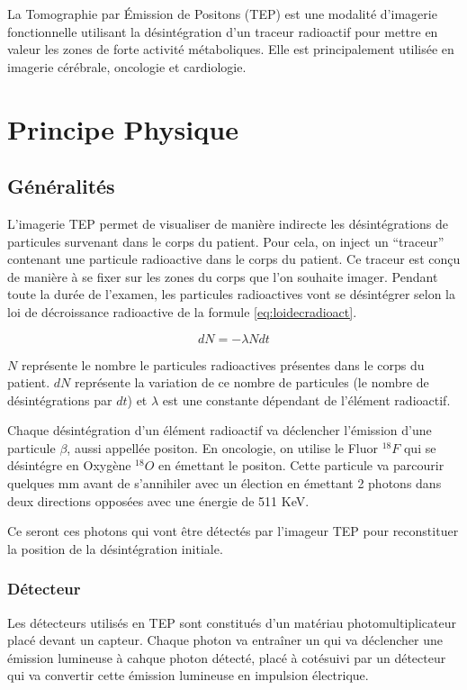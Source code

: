 \label{lab:chapPET}
La Tomographie par \'Emission de Positons (TEP) est une modalité d'imagerie fonctionnelle utilisant la désintégration d'un traceur radioactif pour mettre en valeur les zones de forte activité métaboliques. Elle est principalement utilisée en imagerie cérébrale, oncologie et cardiologie.

\chapter{Principe Physique}


	\section{Généralités}
L'imagerie TEP permet de visualiser de manière indirecte les désintégrations de particules survenant dans le corps du patient. Pour cela, on inject un ``traceur'' contenant une particule radioactive dans le corps du patient. Ce traceur est conçu de manière à se fixer sur les zones du corps que l'on souhaite imager. Pendant toute la durée de l'examen, les particules radioactives vont se désintégrer selon la loi de décroissance radioactive de la formule \ref{eq:loidecradioact}.

\begin{equation}
	dN = - \lambda N dt
	\label{eq:loidecradioact}
\end{equation}

$N$ représente le nombre le particules radioactives présentes dans le corps du patient. $dN$ représente la variation de ce nombre de particules (le nombre de désintégrations par $dt$) et $\lambda$ est une constante dépendant de l'élément radioactif.

Chaque désintégration d'un élément radioactif va déclencher l'émission d'une particule $\beta$, aussi appellée positon. En oncologie, on utilise le Fluor $^{18}F$ qui se désintégre en Oxygène $^{18}O$ en émettant le positon. Cette particule va parcourir quelques mm avant de s'annihiler avec un élection en émettant 2 photons dans deux directions opposées avec une énergie de 511 KeV.

Ce seront ces photons qui vont être détectés par l'imageur TEP pour reconstituer la position de la désintégration initiale. 
	\subsection{Détecteur}

Les détecteurs utilisés en TEP sont constitués d'un matériau photomultiplicateur placé devant un capteur. Chaque photon va entraîner un qui va déclencher une émission lumineuse à cahque photon détecté, placé à cotésuivi par un détecteur qui va convertir cette émission lumineuse en impulsion électrique. 

